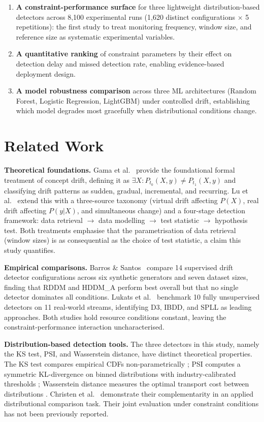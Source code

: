\documentclass[conference]{IEEEtran}
\begin{document}
\begin{enumerate}
\item \textbf{A constraint-performance surface} for three lightweight distribution-based detectors across 8,100 experimental runs (1,620 distinct configurations $\times$ 5 repetitions): the first study to treat monitoring frequency, window size, and reference size as systematic experimental variables.
\item \textbf{A quantitative ranking} of constraint parameters by their effect on detection delay and missed detection rate, enabling evidence-based deployment design.
\item \textbf{A model robustness comparison} across three ML architectures (Random Forest, Logistic Regression, LightGBM) under controlled drift, establishing which model degrades most gracefully when distributional conditions change.
\end{enumerate}

\section{Related Work}

\textbf{Theoretical foundations.} Gama et al.~\cite{gama2013} provide the foundational formal treatment of concept drift, defining it as $\exists X : P_{t_0}(X,y) \neq P_{t_1}(X,y)$ and classifying drift patterns as sudden, gradual, incremental, and recurring. Lu et al.~\cite{lu2019} extend this with a three-source taxonomy (virtual drift affecting $P(X)$, real drift affecting $P(y|X)$, and simultaneous change) and a four-stage detection framework: data retrieval $\rightarrow$ data modelling $\rightarrow$ test statistic $\rightarrow$ hypothesis test. Both treatments emphasise that the parametrisation of data retrieval (window sizes) is as consequential as the choice of test statistic, a claim this study quantifies.

\textbf{Empirical comparisons.} Barros \& Santos~\cite{barros2018} compare 14 supervised drift detector configurations across six synthetic generators and seven dataset sizes, finding that RDDM and HDDM\_A perform best overall but that no single detector dominates all conditions. Lukats et al.~\cite{lukats2024} benchmark 10 fully unsupervised detectors on 11 real-world streams, identifying D3, IBDD, and SPLL as leading approaches. Both studies hold resource conditions constant, leaving the constraint-performance interaction uncharacterised.

\textbf{Distribution-based detection tools.} The three detectors in this study, namely the KS test, PSI, and Wasserstein distance, have distinct theoretical properties. The KS test compares empirical CDFs non-parametrically \cite{pathi2025}; PSI computes a symmetric KL-divergence on binned distributions with industry-calibrated thresholds \cite{taplin2019}; Wasserstein distance measures the optimal transport cost between distributions \cite{prashanth2025}. Christen et al.~\cite{christen2024} demonstrate their complementarity in an applied distributional comparison task. Their joint evaluation under constraint conditions has not been previously reported.
\end{document}
